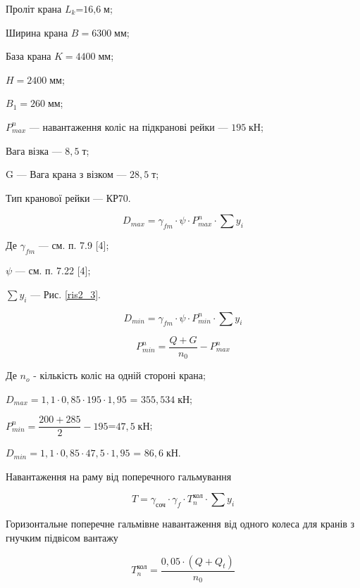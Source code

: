 \documentclass[a4paper,14pt]{article}
\begin{document}
Проліт крана $L_k$=$\textit{16,6}\;\textit{м}$;

Ширина крана $B=6300\;\textit{мм}$;

База крана $K=4400\;\textit{мм}$;

$H=2400\;\textit{мм}$;

$B_1=260\;\textit{мм}$;

$P^n_{max}$ --- навантаження коліс на підкранові рейки --- $195\;\textit{кН}$;

Вага візка --- $8,5\;\textit{т}$;

G --- Вага крана з візком --- $28,5\;\textit{т}$;

Тип кранової рейки --- КР70.



\begin{equation}
    D_{max}=\gamma_{fm}\cdot \psi \cdot P^n_{max} \cdot \sum y_i
\end{equation}

Де $\gamma_{fm}$ --- см. п. 7.9 [4];

$\psi$ --- см. п. 7.22 [4];

$\sum y_i$ --- Рис. \ref{ris2_3}.

\begin{equation}
    D_{min}=\gamma_{fm}\cdot \psi \cdot P^n_{min} \cdot \sum y_i
\end{equation}

\begin{equation}
P^n_{min} = \dfrac {Q+G}{n_0}-P^n_{max}
\end{equation}

Де $n_o$ - кількість коліс на одній стороні крана;

$D_{max}=1,1\cdot 0,85 \cdot 195 \cdot 1,95$ = $355,534\;\textit{кН}$;

$P^n_{min} = \dfrac {200+285}{2}-195$=$47,5\;\textit{кН}$;

$D_{min}=1,1\cdot 0,85 \cdot 47,5 \cdot 1,95$ = $86,6\;\textit{кН}$.

Навантаження на раму від поперечного гальмування

\begin{equation}
    T=\gamma_\textit{соч}\cdot \gamma_f \cdot T^\textit{кол}_{n} \cdot \sum y_i
\end{equation}

Горизонтальне поперечне гальмівне навантаження від одного колеса 
   для кранів з гнучким підвісом вантажу 

\begin{equation}
    T^\textit{кол}_{n}=\dfrac {0,05\cdot (Q+Q_t)}{n_0}
\end{equation}
\end{document}
